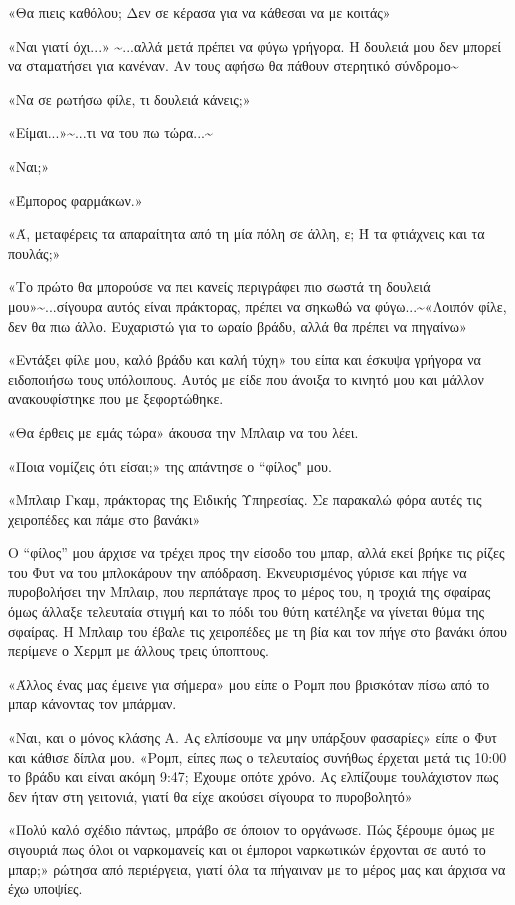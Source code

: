 \documentclass[12pt,twoside, openany]{book}
\begin{document}
«Θα πιεις καθόλου; Δεν σε κέρασα για να κάθεσαι να με κοιτάς»

«Ναι γιατί όχι...» \textasciitilde ...αλλά μετά πρέπει να φύγω γρήγορα. Η δουλειά μου δεν μπορεί να σταματήσει για κανέναν. Αν τους αφήσω θα πάθουν στερητικό σύνδρομο\textasciitilde 

«Να σε ρωτήσω φίλε, τι δουλειά κάνεις;»

«Είμαι...»\textasciitilde ...τι να του πω τώρα...\textasciitilde 

«Ναι;»

«Έμπορος φαρμάκων.»

«Ά, μεταφέρεις τα απαραίτητα από τη μία πόλη σε άλλη, ε; Ή τα φτιάχνεις και τα πουλάς;»

«Το πρώτο θα μπορούσε να πει κανείς περιγράφει πιο σωστά τη δουλειά μου»\textasciitilde ...σίγουρα αυτός είναι πράκτορας, πρέπει να σηκωθώ να φύγω...\textasciitilde «Λοιπόν φίλε, δεν θα πιω άλλο. Ευχαριστώ για το ωραίο βράδυ, αλλά θα πρέπει να πηγαίνω»

«Εντάξει φίλε μου, καλό βράδυ και καλή τύχη» του είπα και έσκυψα γρήγορα να ειδοποιήσω τους υπόλοιπους. Αυτός με είδε που άνοιξα το κινητό μου και μάλλον ανακουφίστηκε που με ξεφορτώθηκε.

«Θα έρθεις με εμάς τώρα» άκουσα την Μπλαιρ να του λέει.

«Ποια νομίζεις ότι είσαι;» της απάντησε ο “φίλος" μου.

«Μπλαιρ Γκαμ, πράκτορας της Ειδικής Υπηρεσίας. Σε παρακαλώ φόρα αυτές τις χειροπέδες και πάμε στο βανάκι»

Ο “φίλος” μου άρχισε να τρέχει προς την είσοδο του μπαρ, αλλά εκεί βρήκε τις ρίζες του Φυτ να του μπλοκάρουν την απόδραση. Εκνευρισμένος γύρισε και πήγε να πυροβολήσει την Μπλαιρ, που περπάταγε προς το μέρος του, η τροχιά της σφαίρας όμως άλλαξε τελευταία στιγμή και το πόδι του θύτη κατέληξε να γίνεται θύμα της σφαίρας. Η Μπλαιρ του έβαλε τις χειροπέδες με τη βία και τον πήγε στο βανάκι όπου περίμενε ο Χερμπ με άλλους τρεις ύποπτους.

«Άλλος ένας μας έμεινε για σήμερα» μου είπε ο Ρομπ που βρισκόταν πίσω από το μπαρ κάνοντας τον μπάρμαν.

«Ναι, και ο μόνος κλάσης Α. Ας ελπίσουμε να μην υπάρξουν φασαρίες» είπε ο Φυτ και κάθισε δίπλα μου.  «Ρομπ, είπες πως ο τελευταίος συνήθως έρχεται μετά τις 10:00 το βράδυ και είναι ακόμη 9:47; Έχουμε οπότε χρόνο. Ας ελπίζουμε τουλάχιστον πως δεν ήταν στη γειτονιά, γιατί θα είχε ακούσει σίγουρα το πυροβολητό»

«Πολύ καλό σχέδιο πάντως, μπράβο σε όποιον το οργάνωσε. Πώς ξέρουμε όμως με σιγουριά πως όλοι οι ναρκομανείς και οι έμποροι ναρκωτικών έρχονται σε αυτό το μπαρ;» ρώτησα από περιέργεια, γιατί όλα τα πήγαιναν με το μέρος μας και άρχισα να έχω υποψίες.
\end{document}
